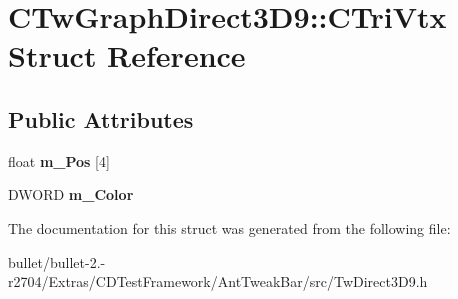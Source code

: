 \hypertarget{struct_c_tw_graph_direct3_d9_1_1_c_tri_vtx}{\section{C\+Tw\+Graph\+Direct3\+D9\+:\+:C\+Tri\+Vtx Struct Reference}
\label{struct_c_tw_graph_direct3_d9_1_1_c_tri_vtx}
}
\subsection*{Public Attributes}
\begin{DoxyCompactItemize}
\item 
\hypertarget{struct_c_tw_graph_direct3_d9_1_1_c_tri_vtx_a1f1fa9334aac233b307f244eaee7546e}{float {\bfseries m\+\_\+\+Pos} \mbox{[}4\mbox{]}}\label{struct_c_tw_graph_direct3_d9_1_1_c_tri_vtx_a1f1fa9334aac233b307f244eaee7546e}

\item 
\hypertarget{struct_c_tw_graph_direct3_d9_1_1_c_tri_vtx_abbc5908d14635a416ef51640a5d057ab}{D\+W\+O\+R\+D {\bfseries m\+\_\+\+Color}}\label{struct_c_tw_graph_direct3_d9_1_1_c_tri_vtx_abbc5908d14635a416ef51640a5d057ab}

\end{DoxyCompactItemize}


The documentation for this struct was generated from the following file\+:\begin{DoxyCompactItemize}
\item 
bullet/bullet-\/2.-\/r2704/\+Extras/\+C\+D\+Test\+Framework/\+Ant\+Tweak\+Bar/src/Tw\+Direct3\+D9.\+h\end{DoxyCompactItemize}
